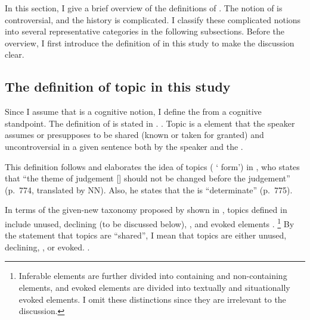 In this section, I give a brief overview of the definitions of .
The notion of  is controversial, and the history is complicated.
I classify these complicated notions into several representative categories in the following subsections.
Before the overview, I first introduce the definition of  in this study to make the discussion clear.

\subsection{The definition of topic in this study}\label{BackSubsecDefTopic}





Since I assume that  is a cognitive notion, I define the  from a cognitive standpoint.
The definition of  is stated in \Next.
%
\ex. \label{BackDefTopic} Topic is a  element that the speaker assumes or presupposes to be shared (known or taken for granted) and uncontroversial in a given sentence both by the speaker and the .

This definition follows and elaborates the idea of topics ( ` form') in ,
who states that ``the theme of judgement [] should not be changed before the judgement'' (p.~774, translated by NN).
Also, he states that the  is ``determinate'' (p.~775).

In terms of the given-new taxonomy proposed by  shown in \Next,
topics defined in \Last include unused, declining (to be discussed below), , and evoked elements \cite[\S 4.4.2]{lambrecht94}.%
 \footnote{
 Inferable elements are further divided into containing and non-containing  elements, and
 evoked elements are divided into textually and situationally evoked elements.
 I omit these distinctions since they are irrelevant to the discussion.
 }
%
By the statement that topics are ``shared'',
I mean that topics are either unused, declining, , or evoked.
\vspace{0.5cm}
%
\ex.\label{Back:Top:DefTop:GNTaxonomy}

